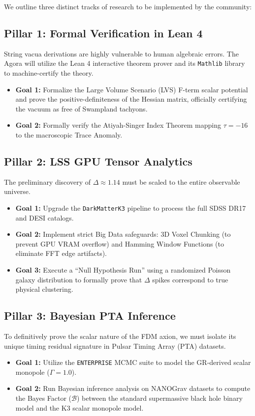\documentclass[aps,prd,twocolumn,nofootinbib,superscriptaddress,10pt]{revtex4-2}
\begin{document}
We outline three distinct tracks of research to be implemented by the community:

\subsection{Pillar 1: Formal Verification in Lean 4}
String vacua derivations are highly vulnerable to human algebraic errors. The Agora will utilize the Lean 4 interactive theorem prover and its \texttt{Mathlib} library to machine-certify the theory.
\begin{itemize}
    \item \textbf{Goal 1:} Formalize the Large Volume Scenario (LVS) F-term scalar potential and prove the positive-definiteness of the Hessian matrix, officially certifying the vacuum as free of Swampland tachyons.
    \item \textbf{Goal 2:} Formally verify the Atiyah-Singer Index Theorem mapping $\tau = -16$ to the macroscopic Trace Anomaly.
\end{itemize}

\subsection{Pillar 2: LSS GPU Tensor Analytics}
The preliminary discovery of $\Delta \approx 1.14$ must be scaled to the entire observable universe.
\begin{itemize}
    \item \textbf{Goal 1:} Upgrade the \texttt{DarkMatterK3} pipeline to process the full SDSS DR17 and DESI catalogs.
    \item \textbf{Goal 2:} Implement strict Big Data safeguards: 3D Voxel Chunking (to prevent GPU VRAM overflow) and Hamming Window Functions (to eliminate FFT edge artifacts).
    \item \textbf{Goal 3:} Execute a ``Null Hypothesis Run'' using a randomized Poisson galaxy distribution to formally prove that $\Delta$ spikes correspond to true physical clustering.
\end{itemize}

\subsection{Pillar 3: Bayesian PTA Inference}
To definitively prove the scalar nature of the FDM axion, we must isolate its unique timing residual signature in Pulsar Timing Array (PTA) datasets.
\begin{itemize}
    \item \textbf{Goal 1:} Utilize the \texttt{ENTERPRISE} MCMC suite to model the GR-derived scalar monopole ($\Gamma = 1.0$).
    \item \textbf{Goal 2:} Run Bayesian inference analysis on NANOGrav datasets to compute the Bayes Factor ($\mathcal{B}$) between the standard supermassive black hole binary model and the K3 scalar monopole model.
\end{itemize}
\end{document}
